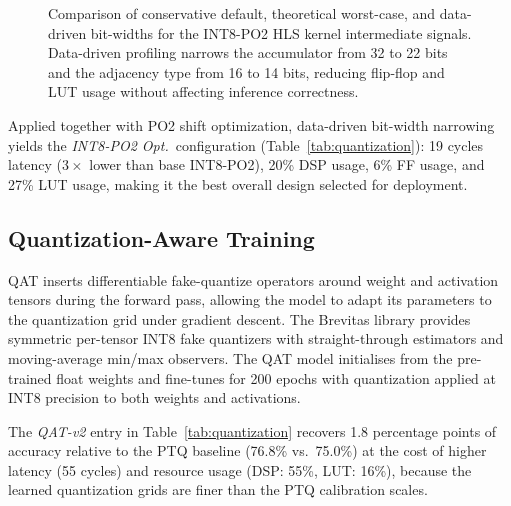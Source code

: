 \documentclass{IEEEtran}
\begin{document}
\begin{figure}[htbp]
    \centering
    \caption{Comparison of conservative default, theoretical worst-case, and data-driven bit-widths for the INT8-PO2 HLS kernel intermediate signals. Data-driven profiling narrows the accumulator from 32 to 22 bits and the adjacency type from 16 to 14 bits, reducing flip-flop and LUT usage without affecting inference correctness.}
    \label{fig:bitwidth_analysis}
\end{figure}

Applied together with PO2 shift optimization, data-driven bit-width narrowing yields the \textit{INT8-PO2 Opt.}\ configuration (Table~\ref{tab:quantization}): 19 cycles latency ($3\times$ lower than base INT8-PO2), 20\% DSP usage, 6\% FF usage, and 27\% LUT usage, making it the best overall design selected for deployment.

\subsection{Quantization-Aware Training}
\label{sec:qat}

QAT inserts differentiable fake-quantize operators around weight and activation tensors during the forward pass, allowing the model to adapt its parameters to the quantization grid under gradient descent. The Brevitas library provides symmetric per-tensor INT8 fake quantizers with straight-through estimators and moving-average min/max observers. The QAT model initialises from the pre-trained float weights and fine-tunes for 200 epochs with quantization applied at INT8 precision to both weights and activations.

The \textit{QAT-v2} entry in Table~\ref{tab:quantization} recovers 1.8 percentage points of accuracy relative to the PTQ baseline (76.8\% vs.\ 75.0\%) at the cost of higher latency (55 cycles) and resource usage (DSP: 55\%, LUT: 16\%), because the learned quantization grids are finer than the PTQ calibration scales.
\end{document}
